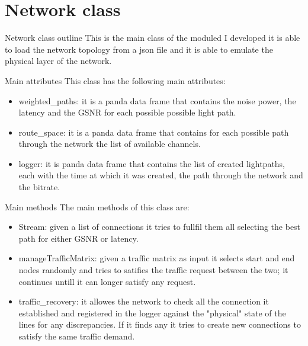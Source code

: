 \documentclass{beamer}
\begin{document}
	\section{Network class}
	\begin{frame}{Network class outline}
		This is the main class of the moduled I developed it is able to load the network topology from a json file and it is able to emulate the physical layer of the network.%
	\end{frame}
	\begin{frame}{Main attributes}
		This class has the following main attributes:
		\begin{itemize}
			\item weighted\_paths: it is a panda data frame that contains the noise power, the latency and the GSNR for each possible possible light path.
			\item route\_space: it is a panda data frame that contains for each possible path through the network the list of available channels.
			\item logger: it is panda data frame that contains the list of created lightpaths, each with the time at which it was created, the path through the network and the bitrate.
		\end{itemize}
	\end{frame}
	\begin{frame}{Main methods}
		The main methods of this class are:
		\begin{itemize}
			\item Stream: given a list of connections it tries to fullfil them all selecting the best path for either GSNR or latency.
			\item manageTrafficMatrix: given a traffic matrix as input it selects start and end nodes randomly and tries to satifies the traffic request between the two; it continues untill it can longer satisfy any request.
			\item traffic\_recovery: it allowes the network to check all the connection it established and registered in the logger against the "physical" state of the lines for any discrepancies. If it finds any it tries to create new connections to satisfy the same traffic demand.
		\end{itemize}
	\end{frame}
\end{document}
